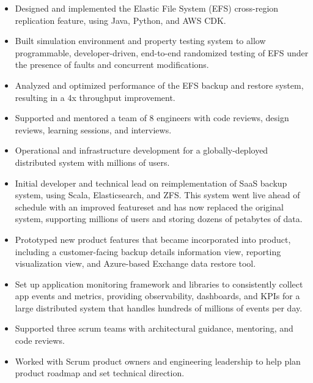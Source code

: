 \documentclass[11pt,a4paper,sans]{moderncv}
\begin{document}
{ \begin{itemize} \itemsep -1pt
  \item Designed and implemented the Elastic File System (EFS) cross-region replication feature, using Java, Python, and AWS CDK.
  \item Built simulation environment and property testing system to allow programmable, developer-driven, end-to-end randomized testing of EFS under the presence of faults and concurrent modifications.
  \item Analyzed and optimized performance of the EFS backup and restore system, resulting in a 4x throughput improvement.
  \item Supported and mentored a team of 8 engineers with code reviews, design reviews, learning sessions, and interviews.
  \item Operational and infrastructure development for a globally-deployed distributed system with millions of users.
 \end{itemize} }

{ \begin{itemize} \itemsep -1pt
  \item Initial developer and technical lead on reimplementation of SaaS backup system, using Scala, Elasticsearch, and ZFS.
    This system went live ahead of schedule with an improved featureset and has now replaced the original system, supporting millions of users and storing dozens of petabytes of data.
  \item Prototyped new product features that became incorporated into product, including a customer-facing backup details information view, reporting visualization view, and Azure-based Exchange data restore tool.
  \item Set up application monitoring framework and libraries to consistently collect app events and metrics, providing observability, dashboards, and KPIs for a large distributed system that handles hundreds of millions of events per day.
  \item Supported three scrum teams with architectural guidance, mentoring, and code reviews.
  \item Worked with Scrum product owners and engineering leadership to help plan product roadmap and set technical direction.
 \end{itemize} }
\end{document}
